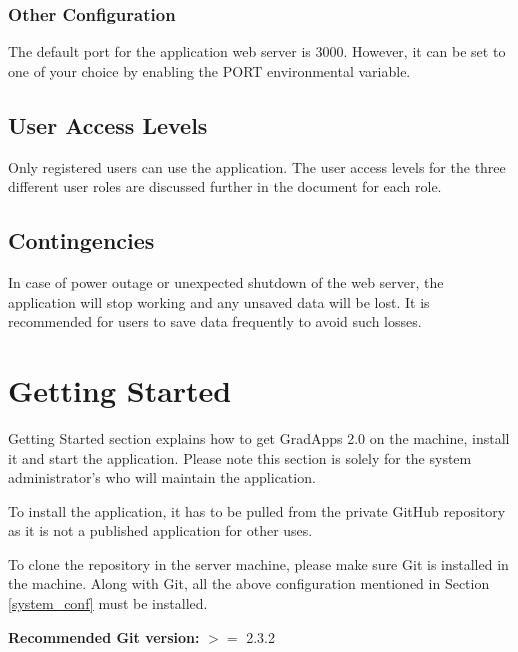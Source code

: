 \documentclass[fontsize=12pt,paper=letter,twoside]{scrartcl}
\begin{document}
\subsubsection{Other Configuration}
The default port for the application web server is 3000. However, it can be set to one of your choice by enabling the PORT environmental variable.

\subsection{User Access Levels}
Only registered users can use the application. The user access levels for the three different user roles are discussed further in the document for each role.

\subsection{Contingencies}
In case of power outage or unexpected shutdown of the web server, the application will stop working and any unsaved data will be lost. It is recommended for users to save data frequently to avoid such losses.

\newpage
\section{Getting Started}
Getting Started section explains how to get GradApps 2.0 on the machine, install it and start the application. Please note this section is solely for the system administrator's who will maintain the application.

\bigskip
\noindent To install the application, it has to be pulled from the private GitHub repository as it is not a published application for other uses.

\bigskip
\noindent To clone the repository in the server machine, please make sure Git is installed in the machine. Along with Git, all the above configuration mentioned in Section \ref{system_conf} must be installed.

\bigskip
\noindent \textbf{Recommended Git version:} $>=$ 2.3.2
\end{document}

